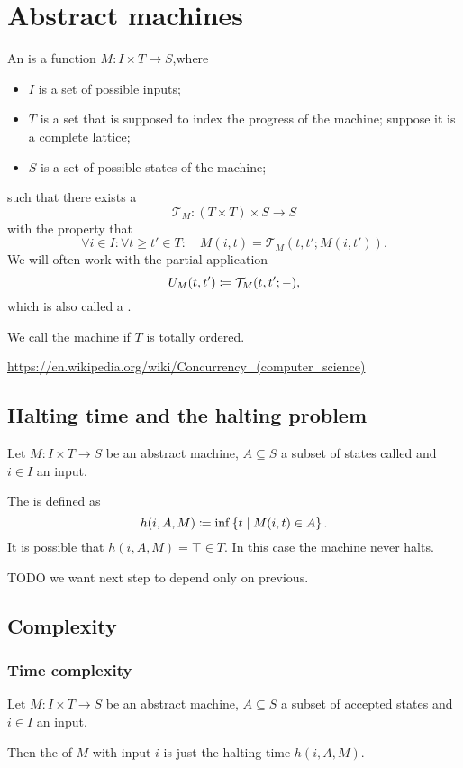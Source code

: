 \section{Abstract machines}
\begin{definition}
An  is a function $M: I\times T \to S$,where
\begin{itemize}
\item $I$ is a set of possible inputs;
\item $T$ is a set that is supposed to index the progress of the machine; suppose it is a complete lattice;
\item $S$ is a set of possible states of the machine;
\end{itemize}
such that there exists a 
\[ \mathcal{T}_M: (T\times T)\times S \to S \]
with the property that
\[ \forall i\in I: \forall t \geq t'\in T: \quad M(i,t) = \mathcal{T}_M(t,t'; M(i,t')). \]
We will often work with the partial application
\[ U_M(t,t') \coloneqq \mathcal{T}_M(t,t'; -), \]
which is also called a .

We call the machine  if $T$ is totally ordered.
\end{definition}

\url{https://en.wikipedia.org/wiki/Concurrency_(computer_science)}

\subsection{Halting time and the halting problem}
\begin{definition}
Let $M: I\times T \to S$ be an abstract machine, $A \subseteq S$ a subset of states called  and $i\in I$ an input.

The  is defined as
\[ h(i,A, M) \coloneqq \inf\left\{ t \;\middle|\; M(i,t) \in A \right\}. \]
It is possible that $h(i,A, M) = \top \in T$. In this case the machine never halts.
\end{definition}

TODO we want next step to depend only on previous.

\subsection{Complexity}
\subsubsection{Time complexity}
\begin{definition}
Let  $M: I\times T \to S$ be an abstract machine, $A \subseteq S$ a subset of accepted states and $i\in I$ an input.

Then the  of $M$ with input $i$ is just the halting time $h(i,A, M)$.
\end{definition}

